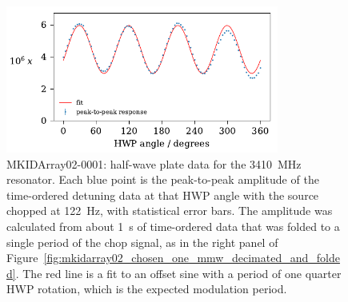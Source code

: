 \begin{figure}[htb]
\centering
\includegraphics[width=0.8\textwidth]{multichroic/mkidarray02_chosen_one_fit_hwp.pdf}
\caption[MKIDArray02-0001: half-wave plate data for the \SI{3410}{MHz} resonator.]
{
MKIDArray02-0001: half-wave plate data for the \SI{3410}{MHz} resonator.
Each blue point is the peak-to-peak amplitude of the time-ordered detuning data at that HWP angle with the source chopped at \SI{122}{Hz}, with statistical error bars.
The amplitude was calculated from about \SI{1}{s} of time-ordered data that was folded to a single period of the chop signal, as in the right panel of Figure~\ref{fig:mkidarray02_chosen_one_mmw_decimated_and_folded}.
The red line is a fit to an offset sine with a period of one quarter HWP rotation, which is the expected modulation period.
}
\label{fig:mkidarray02_chosen_one_fit_hwp}
\end{figure}

